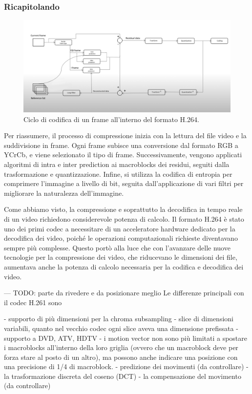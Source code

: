 \documentclass[a4paper,12pt, oneside]{article}
\begin{document}
\subsubsection{Ricapitolando}
\begin{figure}[h]
    \centering
    \includegraphics[width=1\textwidth]{images/h264-coding-loop.png}
    \caption{Ciclo di codifica di un frame all'interno del formato H.264.}
    \label{fig:h264_coding_loop}
\end{figure}

\noindent Per riassumere, il processo di compressione inizia con la lettura del file video e la
suddivisione in frame. Ogni frame subisce una conversione dal formato RGB a YCrCb, e viene
selezionato il tipo di frame. Successivamente, vengono applicati algoritmi di intra e inter prediction
ai macroblocks dei residui, seguiti dalla trasformazione e quantizzazione. Infine, si utilizza la
codifica di entropia per comprimere l'immagine a livello di bit, seguita dall'applicazione di vari
filtri per migliorare la naturalezza dell'immagine.

Come abbiamo visto, la compressione e soprattutto la decodifica in tempo reale di un video richiedono
considerevole potenza di calcolo. Il formato H.264 è stato uno dei primi codec a necessitare di un
acceleratore hardware dedicato per la decodifica dei video, poiché le operazioni computazionali richieste
diventavano sempre più complesse. Questo portò alla luce che con l'avanzare delle nuove tecnologie per
la compressione dei video, che riducevano le dimensioni dei file, aumentava anche la potenza di calcolo
necessaria per la codifica e decodifica dei video.

---
TODO: parte da rivedere e da posizionare meglio
Le differenze principali con il codec H.261 sono

- supporto di più dimensioni per la chroma subsampling
- slice di dimensioni variabili, quanto nel vecchio codec ogni slice aveva una dimensione prefissata
- supporto a DVD, ATV, HDTV
- i motion vector non sono più limitati a spostare i macroblocks all'interno della loro griglia
(ovvero che un macroblock deve per forza stare al posto di un altro), ma possono anche indicare una
posizione con una precisione di 1/4 di macroblock.
- predizione dei movimenti  (da controllare)
- la trasformazione discreta del coseno (DCT)
- la compensazione del movimento (da controllare)
\end{document}
